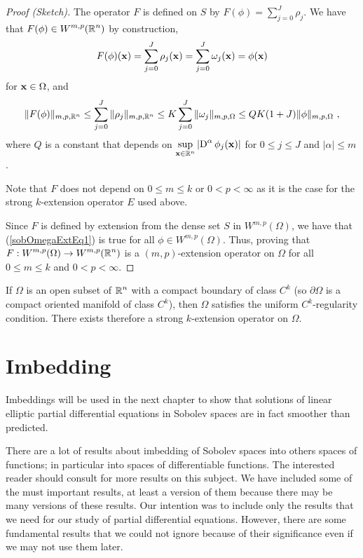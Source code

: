 \begin{proof}[Proof (Sketch)]
The operator $F$ is defined on $S$ by
$\displaystyle F(\phi) = \sum_{j=0}^J \rho_j$.
We have that $\displaystyle F(\phi) \in W^{m,p}(\mathbb{R}^n)$ by construction,
\[
  F(\phi)(\mathbf{x}) = \sum_{j=0}^J \rho_j(\mathbf{x})
  = \sum_{j=0}^J \omega_j(\mathbf{x}) = \phi(\mathbf{x})
\]
for $\mathbf{x} \in \Omega$, and
\begin{equation}\label{sobOmegaExtEq1}
\|F(\phi)\|_{m,p,\mathbb{R}^n} \leq \sum_{j=0}^J \|\rho_j\|_{m,p,\mathbb{R}^n}
\leq K \sum_{j=0}^J \|\omega_j\|_{m,p,\Omega}
\leq QK(1+J)  \|\phi\|_{m,p,\Omega} \ ,
\end{equation}
where $Q$ is a constant that depends on
$\displaystyle \sup_{\mathbf{x} \in \mathbb{R}^n}
\left|\operatorname{D}^\alpha \phi_j(\mathbf{x}) \right|$
for $0 \leq j \leq J$ and $|\alpha| \leq m$.

Note that $F$ does not depend on $0 \leq m \leq k$ or $0 < p < \infty$
as it is the case for the strong $k$-extension operator $E$ used
above.

Since $F$ is defined by extension from the dense set $S$ in
$\displaystyle W^{m,p}(\Omega)$, we have that
(\ref{sobOmegaExtEq1}) is true for all
$\displaystyle \phi \in W^{m,p}(\Omega)$.  Thus, proving that
$\displaystyle F: W^{m,p}(\Omega) \to W^{m,p}(\mathbb{R}^n)$ is a $(m,p)$-extension
operator on $\displaystyle \Omega$ for all
$0\leq m \leq k$ and $0<p<\infty$.
\end{proof}


If $\Omega$ is an open subset of $\displaystyle \mathbb{R}^n$ with a compact
boundary of class $\displaystyle C^k$ (so $\partial \Omega$ is a
compact oriented manifold of class $\displaystyle C^k$),  then
$\Omega$ satisfies the uniform $\displaystyle C^k$-regularity 
condition.  There exists therefore a strong $k$-extension operator on
$\Omega$.

\section{Imbedding}

Imbeddings will be used in the next chapter to show that solutions of
linear elliptic partial differential equations in Sobolev spaces
are in fact smoother than predicted.

There are a lot of results about imbedding of Sobolev spaces into
others spaces of functions; in particular into spaces of
differentiable functions.  The interested reader should consult
\cite{Ad} for more results on this subject.  We have included some of
the must important results, at least a version of them because there
may be many versions of these results.  Our intention was to include
only the results that we need for our study of partial differential
equations.  However, there are some fundamental results that we could
not ignore because of their significance even if we may not use them
later.

